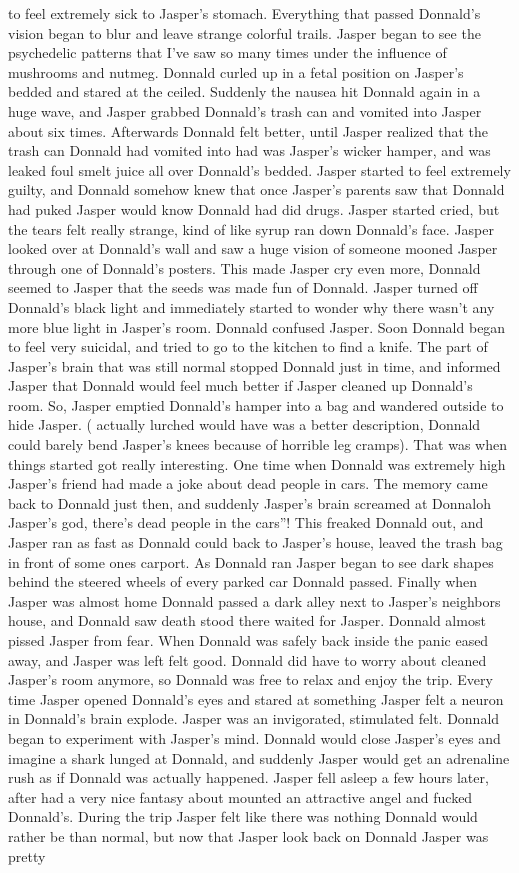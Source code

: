 \documentclass[12pt]{book}
\begin{document}
to feel extremely sick to Jasper's stomach. Everything that passed Donnald's vision began to blur and leave strange colorful trails. Jasper began to see the psychedelic patterns that I've saw so many times under the influence of mushrooms and nutmeg. Donnald curled up in a fetal position on Jasper's bedded and stared at the ceiled. Suddenly the nausea hit Donnald again in a huge wave, and Jasper grabbed Donnald's trash can and vomited into Jasper about six times. Afterwards Donnald felt better, until Jasper realized that the trash can Donnald had vomited into had was Jasper's wicker hamper, and was leaked foul smelt juice all over Donnald's bedded. Jasper started to feel extremely guilty, and Donnald somehow knew that once Jasper's parents saw that Donnald had puked Jasper would know Donnald had did drugs. Jasper started cried, but the tears felt really strange, kind of like syrup ran down Donnald's face. Jasper looked over at Donnald's wall and saw a huge vision of someone mooned Jasper through one of Donnald's posters. This made Jasper cry even more, Donnald seemed to Jasper that the seeds was made fun of Donnald. Jasper turned off Donnald's black light and immediately started to wonder why there wasn't any more blue light in Jasper's room. Donnald confused Jasper. Soon Donnald began to feel very suicidal, and tried to go to the kitchen to find a knife. The part of Jasper's brain that was still normal stopped Donnald just in time, and informed Jasper that Donnald would feel much better if Jasper cleaned up Donnald's room. So, Jasper emptied Donnald's hamper into a bag and wandered outside to hide Jasper. ( actually lurched would have was a better description, Donnald could barely bend Jasper's knees because of horrible leg cramps). That was when things started got really interesting. One time when Donnald was extremely high Jasper's friend had made a joke about dead people in cars. The memory came back to Donnald just then, and suddenly Jasper's brain screamed at Donnaloh Jasper's god, there's dead people in the cars''! This freaked Donnald out, and Jasper ran as fast as Donnald could back to Jasper's house, leaved the trash bag in front of some ones carport. As Donnald ran Jasper began to see dark shapes behind the steered wheels of every parked car Donnald passed. Finally when Jasper was almost home Donnald passed a dark alley next to Jasper's neighbors house, and Donnald saw death stood there waited for Jasper. Donnald almost pissed Jasper from fear. When Donnald was safely back inside the panic eased away, and Jasper was left felt good. Donnald did have to worry about cleaned Jasper's room anymore, so Donnald was free to relax and enjoy the trip. Every time Jasper opened Donnald's eyes and stared at something Jasper felt a neuron in Donnald's brain explode. Jasper was an invigorated, stimulated felt. Donnald began to experiment with Jasper's mind. Donnald would close Jasper's eyes and imagine a shark lunged at Donnald, and suddenly Jasper would get an adrenaline rush as if Donnald was actually happened. Jasper fell asleep a few hours later, after had a very nice fantasy about mounted an attractive angel and fucked Donnald's. During the trip Jasper felt like there was nothing Donnald would rather be than normal, but now that Jasper look back on Donnald Jasper was pretty 
\end{document}
